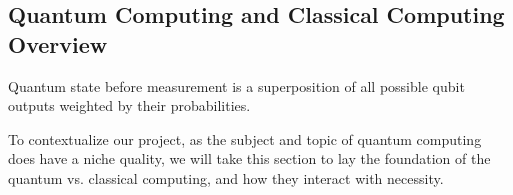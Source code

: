 \subsection{Quantum Computing and Classical Computing Overview}
\label{sec:quantumoverview}

\cite{feng_quantum_2023}
Quantum state before measurement is a superposition of all possible qubit outputs weighted by their probabilities.

To contextualize our project, as the subject and topic of quantum computing does have a niche quality, we will take this section to lay the foundation of the quantum vs. classical computing, and how they interact with necessity.
